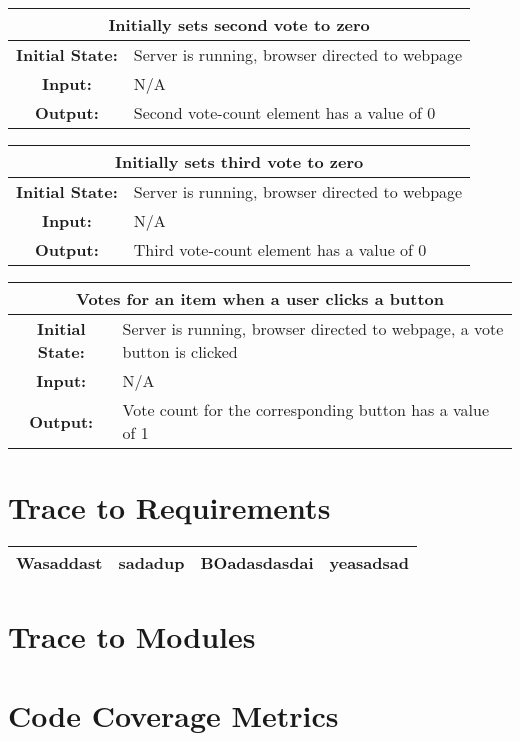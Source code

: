 \documentclass[12pt, titlepage]{article}
\begin{document}
\begin{center}
\begin{table}[H]
\begin{tabularx}{\textwidth}{| c X |}
\hline
\multicolumn{2}{|c|}{\textbf{Initially sets second vote to zero}}\\
\hline
\textbf{Initial State: } & Server is running, browser directed to webpage\\
\textbf{Input: } & N/A\\
\textbf{Output: } & Second vote-count element has a value of 0\\
\hline
\end{tabularx}
\end{table}
\end{center}


\begin{center}
\begin{table}[H]
\begin{tabularx}{\textwidth}{| c X |}
\hline
\multicolumn{2}{|c|}{\textbf{Initially sets third vote to zero}}\\
\hline
\textbf{Initial State: } & Server is running, browser directed to webpage\\
\textbf{Input: } & N/A\\
\textbf{Output: } & Third vote-count element has a value of 0\\
\hline
\end{tabularx}
\end{table}
\end{center}


\begin{center}
\begin{table}[H]
\begin{tabularx}{\textwidth}{| c X |}
\hline
\multicolumn{2}{|c|}{\textbf{Votes for an item when a user clicks a button}}\\
\hline
\textbf{Initial State: } & Server is running, browser directed to webpage, a vote button is clicked\\
\textbf{Input: } & N/A\\
\textbf{Output: } & Vote count for the corresponding button has a value of 1\\
\hline
\end{tabularx}
\end{table}
\end{center}

\section{Trace to Requirements}
\begin{center}
\begin{tabular}{| c | c | c | c |}
\hline
Wasaddast & sadadup & BOadasdasdai & yeasadsad \\
\hline
\end{tabular}
\end{center}
\section{Trace to Modules}		

\section{Code Coverage Metrics}




\end{document}
